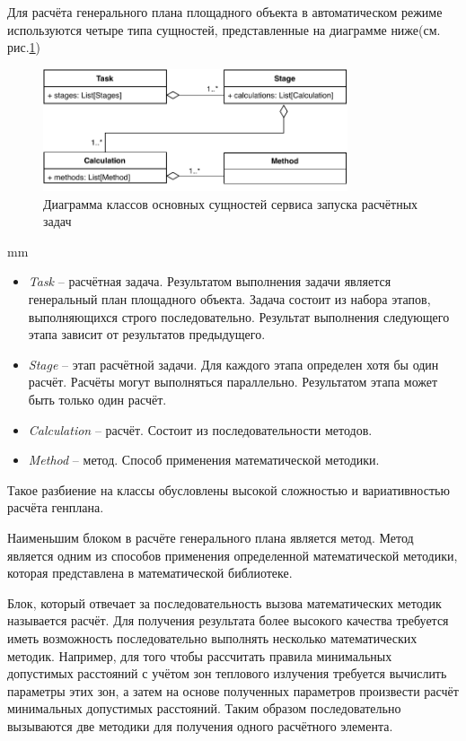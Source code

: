 Для расчёта генерального плана площадного объекта в автоматическом режиме используются четыре типа сущностей,
представленные на диаграмме ниже(см. рис.\ref{pic:architecture__orchestrator-classes})

\begin{figure}[H]
	\includegraphics[width=0.8\textwidth]{architecture/pictures/orchestrator/classes}
	\caption{Диаграмма классов основных сущностей сервиса запуска расчётных задач}
	\label{pic:architecture__orchestrator-classes}
\end{figure}
 mm

\begin{itemize}
	\item {
		\textit{Task} -- расчётная задача.
		Результатом выполнения задачи является генеральный план площадного объекта.
		Задача состоит из набора этапов, выполняющихся строго последовательно.
		Результат выполнения следующего этапа зависит от результатов предыдущего.
	}
	\item {
		\textit{Stage} -- этап расчётной задачи.
		Для каждого этапа определен хотя бы один расчёт.
		Расчёты могут выполняться параллельно.
		Результатом этапа может быть только один расчёт.
	}
	\item {
		\textit{Calculation} -- расчёт. Состоит из последовательности методов.
	}
	\item {
		\textit{Method} -- метод. Способ применения математической методики.
	}
\end{itemize}

Такое разбиение на классы обусловлены высокой сложностью и вариативностью расчёта генплана.

Наименьшим блоком в расчёте генерального плана является метод. Метод является одним из способов применения
определенной математической методики, которая представлена в математической библиотеке.

Блок, который отвечает за последовательность вызова математических методик называется расчёт.
Для получения результата более высокого качества требуется иметь возможность последовательно выполнять несколько
математических методик.
Например, для того чтобы рассчитать правила минимальных допустимых расстояний с учётом зон теплового излучения
требуется вычислить параметры этих зон, а затем на основе полученных параметров произвести расчёт минимальных
допустимых расстояний. Таким образом последовательно вызываются две методики для получения одного расчётного элемента.

